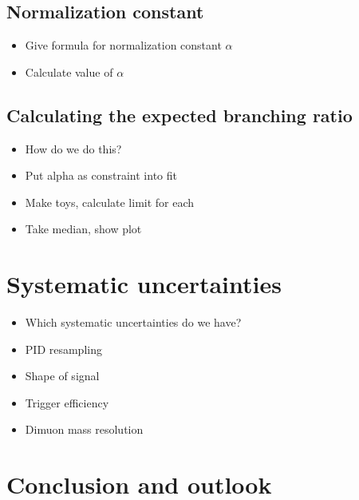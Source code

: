 \section{Normalization constant}

\begin{itemize}
  \item Give formula for normalization constant $α$
  \item Calculate value of $α$
\end{itemize}

\section{Calculating the expected branching ratio}

\begin{itemize}
  \item How do we do this?
  \item Put alpha as constraint into fit
  \item Make toys, calculate limit for each
  \item Take median, show plot
\end{itemize}

\chapter{Systematic uncertainties} %

\begin{itemize}
  \item Which systematic uncertainties do we have?
  \item PID resampling
  \item Shape of signal
  \item Trigger efficiency
  \item Dimuon mass resolution
\end{itemize}

\chapter{Conclusion and outlook} %

